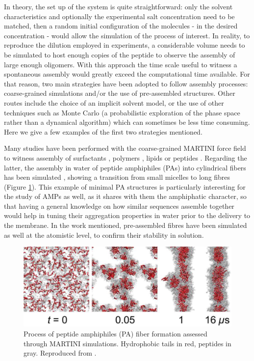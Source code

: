 In theory, the set up of the system is quite straightforward: only the solvent characteristics and optionally the experimental salt concentration need to be matched, then a random initial configuration of the molecules - in the desired concentration - would allow the simulation of the process of interest.
%
In reality, to reproduce the dilution employed in experiments, a considerable volume needs to be simulated to host enough copies of the peptide to observe the assembly of large enough oligomers.
%
With this approach the time scale useful to witness a spontaneous assembly would greatly exceed the computational time available. For that reason, two main strategies have been adopted to follow assembly processes: coarse-grained simulations and/or the use of pre-assembled structures. Other routes include the choice of an implicit solvent model, or the use of other techniques such as Monte Carlo (a probabilistic exploration of the phase space rather than a dynamical algorithm) which can sometimes be less time consuming. Here we give a few examples of the first two strategies mentioned.

Many studies have been performed with the coarse-grained MARTINI force field to witness assembly of surfactants \citep{Wu2012}, polymers \citep{Wang2012poly,Bochicchio2017}, lipids \citep{Lee2011,Brocos2012} or peptides \citep{Guo2012,Seo2012}.
%
Regarding the latter, the assembly in water of peptide amphiphiles (PAs) into cylindrical fibers has been simulated \citep{Lee2012}, showing a transition from small micelles to long fibres (Figure \ref{fig:PA}). This example of minimal PA structures is particularly interesting for the study of AMPs as well, as it shares with them the amphiphatic character, so that having a general knowledge on how similar sequences assemble together would help in tuning their aggregation properties in water prior to the delivery to the membrane.
%
In the work mentioned, pre-assembled fibres have been simulated as well at the atomistic level, to confirm their stability in solution.
%
\begin{figure}[t!]
\centering
\includegraphics[width=0.8\linewidth]{2methods/pics/PA.jpeg}
%
\caption[Peptide amphiphiles assembly through MARTINI simulations]{Process of peptide amphiphiles (PA) fiber formation assessed through MARTINI simulations. Hydrophobic tails in red, peptides in gray. Reproduced from \citet{Lee2012}.}
\label{fig:PA}
\end{figure}

